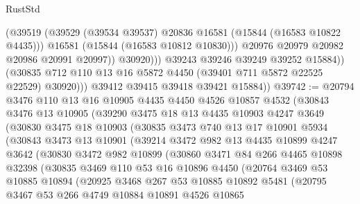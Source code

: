 \begin{lexlean}{RustStd}
\begin{coremodule}
                          (@39519
                            (@39529 (@39534 @39537) @20836 @16581 (@15844 (@16583 @10822 @4435)))
                            @16581
                            (@15844 (@16583 @10812 @10830)))
                          @20976
                          @20979
                          @20982
                          @20986
                          @20991
                          @20997))
                      @30920)))
                @39243
                @39246
                @39249
                @39252
                @15884))
            (@30835 @712 @110 @13 @16 @5872 @4450 (@39401 @711 @5872 @22525 @22529) @30920)))
        @39412
        @39415
        @39418
        @39421
        @15884))
@39742 := @20794
    @3476
    @110
    @13
    @16
    @10905
    @4435
    @4450
    @4526
    @10857
    @4532
    (@30843
      @3476
      @13
      @10905
      (@39290
        @3475
        @18
        @13
        @4435
        @10903
        @4247
        @3649
        (@30830
          @3475
          @18
          @10903
          (@30835
            @3473
            @740
            @13
            @17
            @10901
            @5934
            (@30843
              @3473
              @13
              @10901
              (@39214
                @3472
                @982
                @13
                @4435
                @10899
                @4247
                @3642
                (@30830
                  @3472
                  @982
                  @10899
                  (@30860
                    @3471
                    @84
                    @266
                    @4465
                    @10898
                    @32398
                    (@30835
                      @3469
                      @110
                      @53
                      @16
                      @10896
                      @4450
                      (@20764
                        @3469
                        @53
                        @10885
                        @10894
                        (@20925
                          @3468
                          @267
                          @53
                          @10885
                          @10892
                          @5481
                          (@20795
                            @3467
                            @53
                            @266
                            @4749
                            @10884
                            @10891
                            @4526
                            @10865

\end{coremodule}
\end{lexlean}
